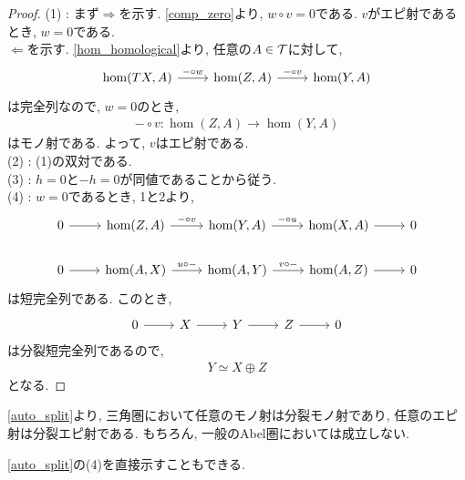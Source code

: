 \documentclass[uplatex, a4paper, 14Q, dvipdfmx]{jsarticle}
\begin{document}
\begin{proof}
  (1) : まず$\Rightarrow$を示す. 
  \cref{comp_zero}より, $w \circ v = 0$である. 
  $v$がエピ射であるとき, $w = 0$である. \\
  $\Leftarrow$を示す. 
  \cref{hom_homological}より, 任意の$A \in \mathcal{T}$に対して, 
  \[\begin{tikzcd}
    {\hom(TX,A)} & {\hom(Z,A)} & {\hom(Y,A)} 
    \arrow["{- \circ w}", from=1-1, to=1-2]
    \arrow["{- \circ v}", from=1-2, to=1-3]
  \end{tikzcd}\]
  は完全列なので, $w=0$のとき, 
  \begin{align*}
    - \circ v: \hom(Z,A) \to \hom(Y,A)
  \end{align*}
  はモノ射である. 
  よって, $v$はエピ射である. \\
  (2) : (1)の双対である. \\
  (3) : $h=0$と$-h=0$が同値であることから従う. \\
  (4) : $w=0$であるとき, 1と2より,
  \[\begin{tikzcd}
    0 & {\hom(Z,A)} & {\hom(Y,A)} & {\hom(X,A)} & 0 \\
    0 & {\hom(A,X)} & {\hom(A,Y)} & {\hom(A,Z)} & 0
    \arrow[from=1-1, to=1-2]
    \arrow["{- \circ v}", from=1-2, to=1-3]
    \arrow["{- \circ u}", from=1-3, to=1-4]
    \arrow[from=1-4, to=1-5]
    \arrow[from=2-1, to=2-2]
    \arrow["{v \circ -}", from=2-3, to=2-4]
    \arrow[from=2-4, to=2-5]
    \arrow["{u \circ -}", from=2-2, to=2-3]
  \end{tikzcd}\]
  は短完全列である. 
  このとき,
  \[\begin{tikzcd}
    0 & X & Y & Z & 0
    \arrow[from=1-1, to=1-2]
    \arrow[from=1-2, to=1-3]
    \arrow[from=1-3, to=1-4]
    \arrow[from=1-4, to=1-5]
  \end{tikzcd}\]
  は分裂短完全列であるので, 
  \begin{align*}
    Y \simeq X \oplus Z
  \end{align*}
  となる. 
\end{proof}

\begin{remark}
  \cref{auto_split}より, 三角圏において任意のモノ射は分裂モノ射であり, 任意のエピ射は分裂エピ射である. 
  もちろん, 一般のAbel圏においては成立しない. 
\end{remark}

\begin{remark}
  \cref{auto_split}の(4)を直接示すこともできる. 
\end{remark}
\end{document}
